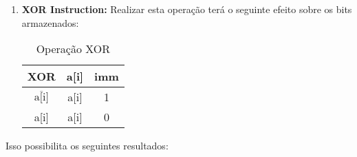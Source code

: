 \documentclass{article}
\begin{document}
\begin{enumerate}[rightmargin = \leftmargin]
                    \item \textbf{XOR Instruction:} Realizar esta operação terá o seguinte efeito sobre os bits armazenados:
                        \begin{table}[H]
                            \centering
                            \begin{tabular}[]{c|cc}\hline
                                XOR                      & a[i] & imm\\\hline
                                $\overline{\text{a[i]}}$ & a[i] & 1\\
                                a[i]                     & a[i] & 0\\\hline
                            \end{tabular}
                            \caption{Operação XOR}
                        \end{table}\noindent
                \end{enumerate}
            Isso possibilita os seguintes resultados:
\end{document}
